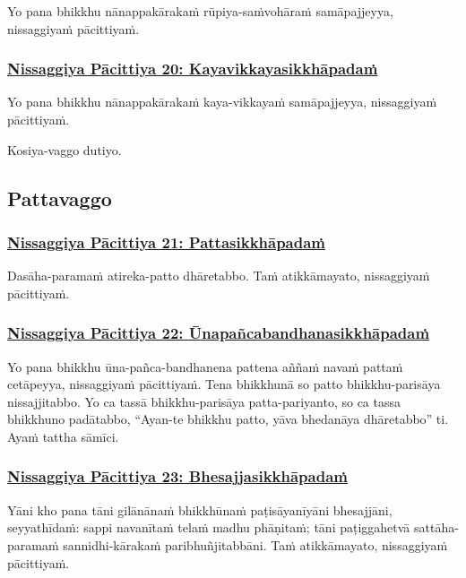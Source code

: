 Yo pana bhikkhu nānappakārakaṁ rūpiya-saṁvohāraṁ samāpajjeyya, nissaggiyaṁ pācittiyaṁ.

\subsubsection*{\hyperref[forf-exp20]{Nissaggiya Pācittiya 20: Kayavikkayasikkhāpadaṁ}}
\label{np20}

Yo pana bhikkhu nānappakārakaṁ kaya-vikkayaṁ samāpajjeyya, nissaggiyaṁ pācittiyaṁ.

\begin{center}
  Kosiya-vaggo dutiyo.
\end{center}

\subsection{Pattavaggo}
\vspace{0.2cm}

\subsubsection*{\hyperref[forf-exp21]{Nissaggiya Pācittiya 21: Pattasikkhāpadaṁ}}
\label{np21}

Dasāha-paramaṁ atireka-patto dhāretabbo. Taṁ atikkāmayato, nissaggiyaṁ pācittiyaṁ.

\subsubsection*{\hyperref[forf-exp22]{Nissaggiya Pācittiya 22: Ūnapañcabandhanasikkhāpadaṁ}}
\label{np22}

Yo pana bhikkhu ūna-pañca-bandhanena pattena aññaṁ navaṁ pattaṁ cetāpeyya, nissaggiyaṁ pācittiyaṁ. Tena bhikkhunā so patto bhikkhu-parisāya nissajjitabbo. Yo ca tassā bhikkhu-parisāya patta-pariyanto, so ca tassa bhikkhuno padātabbo, “Ayan-te bhikkhu patto, yāva bhedanāya dhāretabbo” ti. Ayaṁ tattha sāmīci.

\subsubsection*{\hyperref[forf-exp23]{Nissaggiya Pācittiya 23: Bhesajjasikkhāpadaṁ}}
\label{np23}

Yāni kho pana tāni gilānānaṁ bhikkhūnaṁ paṭisāyanīyāni bhesajjāni, seyyathīdaṁ: sappi navanītaṁ telaṁ madhu phāṇitaṁ; tāni paṭiggahetvā sattāha-paramaṁ sannidhi-kārakaṁ paribhuñjitabbāni. Taṁ atikkāmayato, nissaggiyaṁ pācittiyaṁ.

